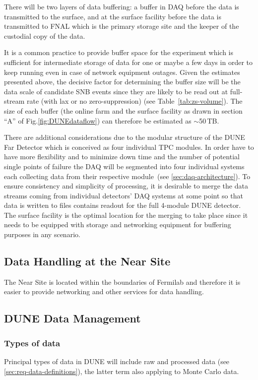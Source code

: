 There will be two layers of data buffering: a buffer in DAQ before the data is transmitted to the surface,
and at the surface facility before the data is transmitted to FNAL which is the primary storage site and the
keeper of the custodial copy of the data.

It is a common practice to provide buffer space for the experiment which is sufficient for intermediate storage of data
for one or maybe a few days in order to keep running even in case of network equipment outages. Given the estimates
presented above, the decisive factor for determining the buffer size will be the data scale of candidate SNB events since
they are likely to be read out at full-stream rate (with lax or no zero-suppression) (see Table~\ref{tab:zs-volume}). The
size of each buffer (the online farm and the surface facility as drawn in section ``A'' of Fig.\ref{fig:DUNEdataflow})
can therefore be estimated as $\sim$50\,TB.

 There are additional considerations due to the modular structure of the DUNE Far Detector
which is conceived as four individual TPC modules. In order have to have more flexibility and to minimize down time
and the number of potential single points of failure the DAQ will be segmented into four individual  systems each collecting
data from their respective module~(see \ref{sec:daq-architecture}). To ensure
consistency and simplicity of processing, it is desirable to merge the data streams coming from individual detectors' DAQ systems
at some point so that data is written to files contains readout for the full 4-module DUNE detector. The surface facility is the optimal location
for the merging to take place since it needs to be equipped with storage and networking equipment for buffering purposes in any scenario.

\subsection{Data Handling at the Near Site}
The Near Site is located within the boundaries of Fermilab and therefore it is easier to provide networking and other services for data handling.

\subsection{DUNE Data Management}
\subsubsection{Types of data}
Principal types of data in DUNE will include raw and processed data (see \ref{sec:req-data-definitions}),
the latter term also applying to Monte Carlo data.

